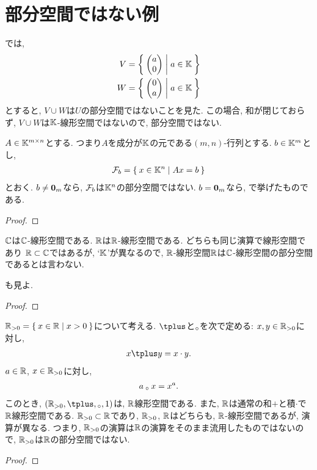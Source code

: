 \section{部分空間ではない例}

\begin{example}
  では,
  \begin{align*}
    V&=\Set{\begin{pmatrix}a\\0\end{pmatrix}|a\in\mathbb{K}}\\
    W&=\Set{\begin{pmatrix}0\\a\end{pmatrix}|a\in\mathbb{K}}
  \end{align*}
  とすると, $V\cup W$は$U$の部分空間ではないことを見た.
  この場合, 和が閉じておらず, $V\cup W$は$\mathbb{K}$-線形空間ではないので,
  部分空間ではない.
\end{example}

\begin{example}
  \label{subsp:nonexample:fiber}
  $A\in \mathbb{K}^{m\times n}$とする.
  つまり$A$を成分が$\mathbb{K}$の元である$(m,n)$-行列とする.
  $b\in \mathbb{K}^m$とし,
  \begin{align*}
    \mathcal{F}_b=\Set{x\in \mathbb{K}^n|Ax=b}
  \end{align*}
  とおく.
  $b\neq \boldsymbol{0}_m$なら,
  $\mathcal{F}_b$は$\mathbb{K}^n$の部分空間ではない.
  $b= \boldsymbol{0}_m$なら,
  で挙げたものである.
\end{example}
\begin{proof}\end{proof}



\begin{example}
  \label{subsp:nonexample:cc}
  $\mathbb{C}$は$\mathbb{C}$-線形空間である.
  $\mathbb{R}$は$\mathbb{R}$-線形空間である.
  どちらも同じ演算で線形空間であり
  $\mathbb{R}\subset \mathbb{C}$ではあるが,
  `$\mathbb{K}$'が異なるので,
  $\mathbb{R}$-線形空間$\mathbb{R}$は$\mathbb{C}$-線形空間の部分空間であるとは言わない.

  も見よ.
\end{example}
\begin{proof}\end{proof}

\begin{example}
  $\mathbb{R}_{>0}=\Set{x\in\mathbb{R}|x>0}$について考える.
  $\pplus$と$\mathbin{{}_\circ}$を次で定める:
  $x,y\in\mathbb{R}_{>0}$に対し,
  \begin{align*}
    x\pplus y =x\cdot y.
  \end{align*}
  $a\in\mathbb{R}$, $x\in\mathbb{R}_{>0}$に対し,
  \begin{align*}
    a\mathbin{{}_\circ} x=x^a.
  \end{align*}
  このとき, $(\RR_{>0},\pplus,\aact,1)$は, $\mathbb{R}$線形空間である.
  また, $\mathbb{R}$は通常の和$+$と積$\cdot$で$\mathbb{R}$線形空間である.
  $\mathbb{R}_{>0}\subset \mathbb{R}$であり, $\mathbb{R}_{>0}$, $\mathbb{R}$はどちらも, $\mathbb{R}$-線形空間であるが, 演算が異なる.
  つまり, $\mathbb{R}_{>0}$の演算は$\mathbb{R}$の演算をそのまま流用したものではないので,
  $\mathbb{R}_{>0}$は$\mathbb{R}$の部分空間ではない.
\end{example}
\begin{proof}\end{proof}

